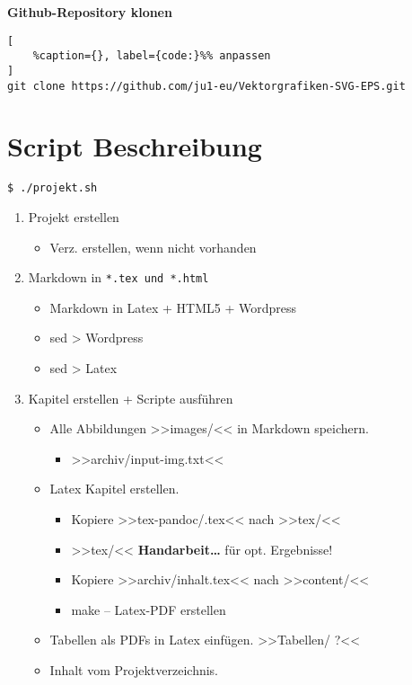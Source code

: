 \textbf{Github-Repository klonen}

\lstset{language=C}%
\begin{lstlisting}[
	%caption={}, label={code:}%% anpassen
]
git clone https://github.com/ju1-eu/Vektorgrafiken-SVG-EPS.git
\end{lstlisting}

\section{Script Beschreibung}\label{script-beschreibung}

\verb|$ ./projekt.sh|

\begin{enumerate}
\item
  Projekt erstellen

  \begin{itemize}
  \item
    Verz. erstellen, wenn nicht vorhanden
  \end{itemize}
\item
  Markdown in \verb|*.tex und *.html|

  \begin{itemize}
  \item
    Markdown in Latex + HTML5 + Wordpress
  \item
    sed > Wordpress
  \item
    sed > Latex
  \end{itemize}
\item
  Kapitel erstellen + Scripte ausführen

  \begin{itemize}
  \item
    Alle Abbildungen >>images/<< in Markdown speichern.

    \begin{itemize}
    \item
      >>archiv/input-img.txt<<
    \end{itemize}
  \item
    Latex Kapitel erstellen.

    \begin{itemize}
    \item
      Kopiere >>tex-pandoc/.tex<< nach >>tex/<<
    \item
      >>tex/<< \textbf{Handarbeit\ldots{}} für opt. Ergebnisse!
    \item
      Kopiere >>archiv/inhalt.tex<< nach >>content/<<
    \item
      make -- Latex-PDF erstellen
    \end{itemize}
  \item
    Tabellen als PDFs in Latex einfügen. >>Tabellen/ ?<<
  \item
    Inhalt vom Projektverzeichnis.


\end{itemize}
\end{enumerate}
